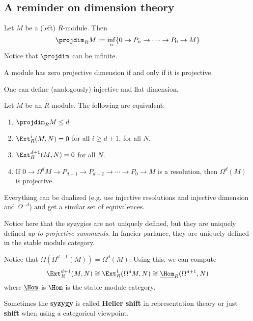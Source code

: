 \documentclass[12pt]{article}
\begin{document}
\subsection{A reminder on dimension theory}
\begin{defn}
	Let $M$ be a (left) $R$-module. Then
	\[\projdim_RM:=\inf_n\{0\to P_n\to\cdots\to P_0\to M\}\]
	Notice that $\projdim$ can be infinite.
\end{defn}
\begin{rmk}
	A module has zero projective dimension if and only if it is projective.
\end{rmk}
\begin{rmk}
	One can define (analogously) injective and flat dimension.
\end{rmk}
\begin{lem}
	Let $M$ be an $R$-module. The following are equivalent:
	\begin{enumerate}
		\item $\projdim_RM\le d$
		\item $\Ext_R^i(M,N)=0$ for all $i\ge d+1$, for all $N$.
		\item $\Ext_R^{d+1}(M,N)=0$ for all $N$.
		\item If $0\to\Omega^dM\to P_{d-1}\to P_{d-2}\to\cdots\to P_0\to M$ is a resolution, then $\Omega^d(M)$ is projective.
	\end{enumerate}
\end{lem}
\begin{rmk}
	Everything can be dualized (e.g. use injective resolutions and injective dimension and $\Omega^{-d}$) 
	and get a similar set of equivalences.
\end{rmk}
\begin{rmk}
	Notice here that the syzygies are not uniquely defined, but they are uniquely defined \textit{up to projective summands.}
	In fancier parlance, they are uniquely defined in the stable module category.
\end{rmk}
\begin{rmk}
	Notice that $\Omega(\Omega^{d-1}(M))=\Omega^d(M)$. Using this, we can compute
	\[\Ext_R^{d+1}(M,N)\cong \Ext_R^1(\Omega^dM,N)\cong\underline{\Hom}_R(\Omega^{d+1},N)\]
	where $\underline{\Hom}$ is $\Hom$ is the stable module category.
\end{rmk}
\begin{rmk}
	Sometimes the \textbf{syzygy} is called \textbf{Heller shift} in representation theory or just \textbf{shift}
	when using a categorical viewpoint.
\end{rmk}
\end{document}
